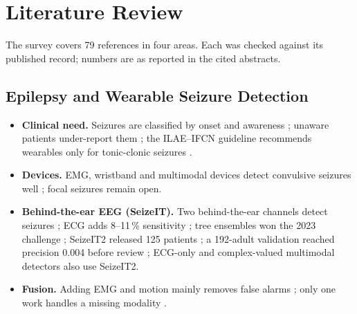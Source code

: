 \chapter{Literature Review}\label{ch:lit}

The survey covers 79 references in four areas. Each was checked against its published record; numbers are as reported
in the cited abstracts.

\section{Epilepsy and Wearable Seizure Detection}\label{sec:lit-clinical}\label{sec:lit-wearable}

\begin{itemize}
\item \textbf{Clinical need.} Seizures are classified by onset and awareness \cite{fisher2017ilae}; unaware patients
  under-report them \cite{elger2018underreporting}; the ILAE--IFCN guideline recommends wearables only for tonic-clonic
  seizures \cite{beniczky2021guideline}.
\item \textbf{Devices.} EMG, wristband and multimodal devices detect convulsive seizures well
  \cite{leijten2018review,beniczky2018emg,onorati2017empatica,regalia2019empatica,naganur2022meta}; focal seizures
  remain open.
\item \textbf{Behind-the-ear EEG (SeizeIT).} Two behind-the-ear channels detect seizures \cite{vandecasteele2020bte};
  ECG adds 8--11\,\% sensitivity \cite{vandecasteele2021ecg,bhagubai2023ecg}; tree ensembles won the 2023 challenge
  \cite{bhagubai2024challenge}; SeizeIT2 released 125 patients \cite{bhagubai2025seizeit2}; a 192-adult validation
  reached precision 0.004 before review \cite{swinnen2026seizeit2}; ECG-only \cite{reintjes2025ecg} and complex-valued
  multimodal \cite{su2026cmepinet} detectors also use SeizeIT2.
\item \textbf{Fusion.} Adding EMG and motion mainly removes false alarms \cite{zhang2024tcs}; only one work handles a
  missing modality \cite{zhang2024cyclic}.
\end{itemize}

